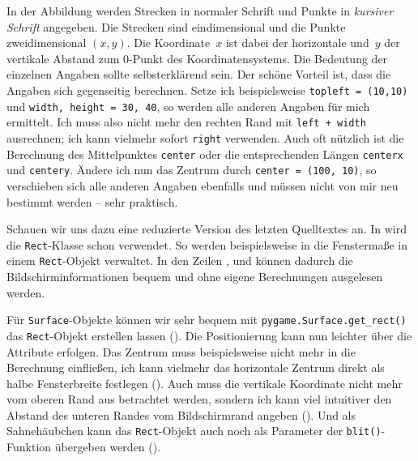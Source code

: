 %
%
%
%
%
%
%
%
%
%
%
In der Abbildung werden Strecken in normaler Schrift und Punkte in \textit{kursiver Schrift} angegeben. Die Strecken sind eindimensional und die Punkte zweidimensional $(x,y)$. Die Koordinate~$x$ ist dabei der horizontale und~$y$ der vertikale Abstand zum 0-Punkt des Koordinatensystems. Die Bedeutung der einzelnen Angaben sollte selbsterklärend sein. Der schöne Vorteil ist, dass die Angaben sich gegenseitig berechnen. Setze ich beispielsweise \texttt{topleft = (10,10)} und \texttt{width, height = 30, 40}, so werden alle anderen Angaben für mich ermittelt. Ich muss also nicht mehr den rechten Rand mit \texttt{left + width} ausrechnen; ich kann vielmehr sofort \texttt{right} verwenden. Auch oft nützlich ist die Berechnung des Mittelpunktes \texttt{center} oder die entsprechenden Längen \texttt{centerx} und \texttt{centery}. Ändere ich nun das Zentrum durch \texttt{center = (100, 10)}, so verschieben sich alle anderen Angaben ebenfalls und müssen nicht von mir neu bestimmt werden -- sehr praktisch.

Schauen wir uns dazu eine reduzierte Version des letzten Quelltextes an. In  wird die \texttt{Rect}-Klasse schon verwendet. So werden beispielsweise in  die Fenstermaße in einem \texttt{Rect}-Objekt verwaltet. In den Zeilen ,  und  können dadurch die Bildschirminformationen bequem und ohne eigene Berechnungen ausgelesen werden.


Für \texttt{Surface}-Objekte können wir sehr bequem mit \texttt{pygame.Surface.get\_rect()} das \texttt{Rect}-Objekt erstellen lassen (). Die Positionierung kann nun leichter über die Attribute erfolgen. Das Zentrum muss beispielsweise nicht mehr in die Berechnung einfließen, ich kann vielmehr das horizontale Zentrum direkt als halbe Fensterbreite festlegen (). Auch muss die vertikale Koordinate nicht mehr vom oberen Rand aus betrachtet werden, sondern ich kann viel intuitiver den Abstand des unteren Randes vom Bildschirmrand angeben (). Und als Sahnehäubchen kann das \texttt{Rect}-Objekt auch noch als Parameter der \texttt{blit()}-Funktion übergeben werden ().

